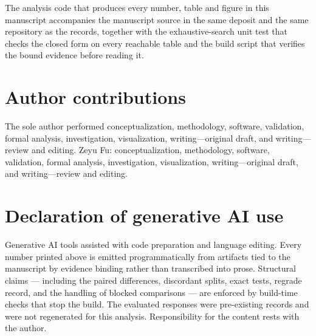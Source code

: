 The analysis code that produces every number, table and figure in this
manuscript accompanies the manuscript source in the same deposit and the same
repository as the records, together with the exhaustive-search unit test that
checks the closed form on every reachable table and the build script that
verifies the bound evidence before reading it.

\section*{Author contributions}

\ifdefined\ANONYMOUS
The sole author performed conceptualization, methodology, software, validation,
formal analysis, investigation, visualization, writing---original draft, and
writing---review and editing.
\else
Zeyu Fu: conceptualization, methodology, software, validation, formal analysis,
investigation, visualization, writing---original draft, and writing---review
and editing.
\fi

\section*{Declaration of generative AI use}

Generative AI tools assisted with code preparation and language editing. Every
number printed above is emitted programmatically from artifacts tied to the
manuscript by evidence binding rather than transcribed into prose. Structural
claims --- including the paired differences, discordant splits, exact tests,
regrade record, and the handling of blocked comparisons --- are enforced by
build-time checks that stop the build. The evaluated responses were
pre-existing records and were not regenerated for this analysis. Responsibility
for the content rests with the author.
